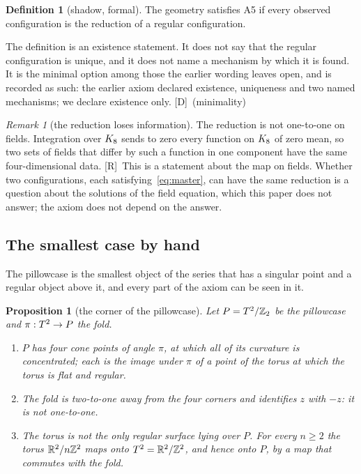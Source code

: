 \documentclass[11pt,a4paper]{article}
\theoremstyle{plain}
\newtheorem{proposition}[theorem]{Proposition}
\theoremstyle{definition}
\newtheorem{definition}[theorem]{Definition}
\theoremstyle{remark}
\newtheorem{remark}[theorem]{Remark}
\newcommand{\rigR}{[\textup{R}]}
\newcommand{\rigD}{[\textup{D}]}
\begin{document}
\begin{definition}[shadow, formal]\label{def:A5}
The geometry satisfies A5 if every observed configuration is the reduction of a regular configuration.
\end{definition}

The definition is an existence statement. It does not say that the regular configuration is unique, and it does not name a mechanism by which it is found. It is the minimal option among those the earlier wording leaves open, and is recorded as such: the earlier axiom declared existence, uniqueness and two named mechanisms; we declare existence only. \rigD\ (minimality)

\begin{remark}[the reduction loses information]\label{rem:loss}
The reduction is not one-to-one on fields. Integration over $K_8$ sends to zero every function on $K_8$ of zero mean, so two sets of fields that differ by such a function in one component have the same four-dimensional data. \rigR\ This is a statement about the map on fields. Whether two configurations, each satisfying~\eqref{eq:master}, can have the same reduction is a question about the solutions of the field equation, which this paper does not answer; the axiom does not depend on the answer.
\end{remark}

\subsection{The smallest case by hand}\label{sec:smallest}

The pillowcase is the smallest object of the series that has a singular point and a regular object above it, and every part of the axiom can be seen in it.

\begin{proposition}[the corner of the pillowcase]\label{prop:smallest}
Let $P=T^2/\mathbb{Z}_2$ be the pillowcase and $\pi:T^2\to P$ the fold.
\begin{enumerate}[label=(\roman*),nosep]
\item $P$ has four cone points of angle $\pi$, at which all of its curvature is concentrated; each is the image under $\pi$ of a point of the torus at which the torus is flat and regular.
\item The fold is two-to-one away from the four corners and identifies $z$ with $-z$: it is not one-to-one.
\item The torus is not the only regular surface lying over $P$. For every $n\ge2$ the torus $\mathbb{R}^{2}/n\mathbb{Z}^{2}$ maps onto $T^2=\mathbb{R}^{2}/\mathbb{Z}^{2}$, and hence onto $P$, by a map that commutes with the fold.
\end{enumerate}
\end{proposition}
\end{document}
